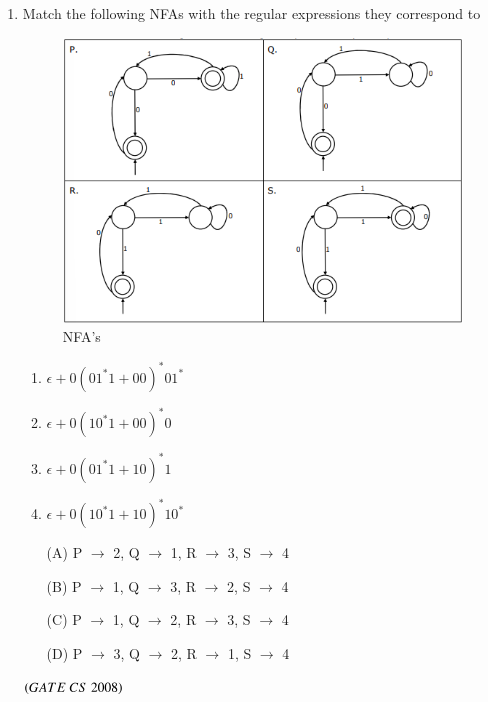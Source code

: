\documentclass[journal, onecolumn]{IEEEtran}
\numberwithin{equation}{enumi}
\numberwithin{figure}{enumi}
\begin{document}
\begin{enumerate}
\item Match the following NFAs with the regular expressions they correspond to 
\begin{figure}[H]
    \centering
    \includegraphics[width=0.5\columnwidth]{figs/fig7.png}
    \caption{NFA's}
    \label{fig:7}
\end{figure}
\begin{center}
\begin{enumerate}
    \item $\epsilon + 0(01^{*}1 + 00)^{*}01^{*}$
    \item $\epsilon + 0(10^{*}1 + 00)^{*}0$
    \item $\epsilon + 0(01^{*}1 + 10)^{*}1$
    \item $\epsilon + 0(10^{*}1 + 10)^{*}10^{*}$
\end{enumerate}
\end{center}
\begin{multicols}{2}
\begin{enumerate}
    \item[(A)] P $\rightarrow$ 2, Q $\rightarrow$ 1, R $\rightarrow$ 3, S $\rightarrow$ 4
    \item[(B)] P $\rightarrow$ 1, Q $\rightarrow$ 3, R $\rightarrow$ 2, S $\rightarrow$ 4
    \item[(C)] P $\rightarrow$ 1, Q $\rightarrow$ 2, R $\rightarrow$ 3, S $\rightarrow$ 4
    \item[(D)] P $\rightarrow$ 3, Q $\rightarrow$ 2, R $\rightarrow$ 1, S $\rightarrow$ 4
\end{enumerate}
\end{multicols}
\hfill $\left(GATE\ CS\  2008\right)$


\end{enumerate}
\end{document}

